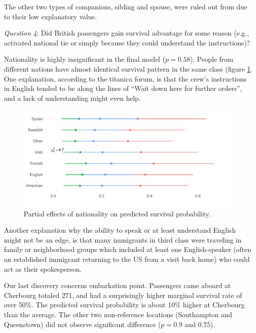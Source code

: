 \documentclass[]{interact}
\theoremstyle{plain}%
\theoremstyle{definition}
\theoremstyle{remark}
\begin{document}
The other two types of companions, sibling and spouse, were ruled out from due to their low explanatory value.

\hfill\break

\emph{Question 4}: Did British passengers gain survival advantage for some reason (e.g., activated national tie or simply because they could understand the instructions)?

Nationality is highly insignificant in the final model (\(p = 0.58\)). People from different nations have almost identical survival pattern in the same class (figure \ref{fig:partial-nationality}. One explanation, according to the titanica forum, is that the crew's instructions in English tended to be along the lines of ``Wait down here for further orders'', and a lack of understanding might even help.

\begin{figure}[H]

{\centering \includegraphics{titanic-survival_files/figure-latex/partial-nationality-1} 

}

\caption{Partial effects of nationality on predicted survival probability. }\label{fig:partial-nationality}
\end{figure}

Another explanation why the ability to speak or at least understand English might not be an edge, is that many immigrants in third class were traveling in family or neighborhood groups which included at least one English-speaker (often an established immigrant returning to the US from a visit back home) who could act as their spokesperson.

\hfill\break

Our last discovery concerns embarkation point. Passengers came aboard at Cherbourg totaled 271, and had a surprisingly higher marginal survival rate of over 50\%. The predicted survival probability is about 10\% higher at Cherbourg than the average. The other two non-reference locations (Southampton and Queenstown) did not observe significant difference (\(p = 0.9\) and \(0.75\)).
\end{document}
